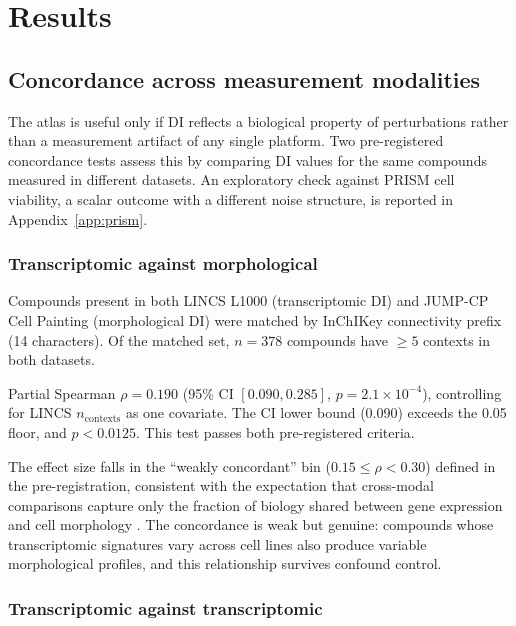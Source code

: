 \documentclass[11pt]{article}
\begin{document}
\section{Results}\label{sec:results}
\subsection{Concordance across measurement modalities}
\label{sec:concordance}

The atlas is useful only if DI reflects a biological property of
perturbations rather than a measurement artifact of any single platform.
Two pre-registered concordance tests assess this by comparing
DI values for the same compounds measured in different datasets.  An
exploratory check against PRISM cell viability, a scalar outcome with a
different noise structure, is reported in Appendix~\ref{app:prism}.

\subsubsection{Transcriptomic against morphological}

Compounds present in both LINCS L1000 (transcriptomic DI) and JUMP-CP
Cell Painting (morphological DI) were matched by InChIKey connectivity
prefix (14 characters).  Of the matched set, $n = 378$ compounds have
$\geq 5$ contexts in both datasets.

Partial Spearman $\rho = 0.190$ (95\% CI $[0.090, 0.285]$,
$p = 2.1 \times 10^{-4}$), controlling for LINCS $n_{\mathrm{contexts}}$
as one covariate.  The CI lower bound (0.090) exceeds the 0.05 floor,
and $p < 0.0125$.  This test passes both pre-registered criteria.

The effect size falls in the ``weakly concordant'' bin
($0.15 \leq \rho < 0.30$) defined in the pre-registration, consistent
with the expectation that cross-modal comparisons capture only the
fraction of biology shared between gene expression and cell morphology
\citep{haghighi2022crossmodal}.  The concordance is weak but genuine:
compounds whose transcriptomic signatures vary across cell lines also
produce variable morphological profiles, and this relationship survives
confound control.

\subsubsection{Transcriptomic against transcriptomic}
\end{document}
